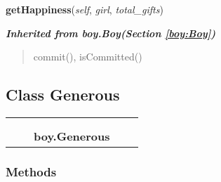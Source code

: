     \label{boy:Miser:getHappiness}

    \vspace{0.5ex}

\hspace{.8\funcindent}\begin{boxedminipage}{\funcwidth}

    \raggedright \textbf{getHappiness}(\textit{self}, \textit{girl}, \textit{total\_gifts})

\setlength{\parskip}{2ex}
\setlength{\parskip}{1ex}
    \end{boxedminipage}


\large{\textbf{\textit{Inherited from boy.Boy\textit{(Section \ref{boy:Boy})}}}}

\begin{quote}
commit(), isCommitted()
\end{quote}


\subsection{Class Generous}

    \label{boy:Generous}
\begin{tabular}{cccccc}
\multicolumn{2}{r}{\settowidth{\BCL}{boy.Boy}\multirow{2}{\BCL}{boy.Boy}}
&&
  \\\cline{3-3}
  &&\multicolumn{1}{c|}{}
&&
  \\
&&\multicolumn{2}{l}{\textbf{boy.Generous}}
\end{tabular}



  \subsubsection{Methods}


